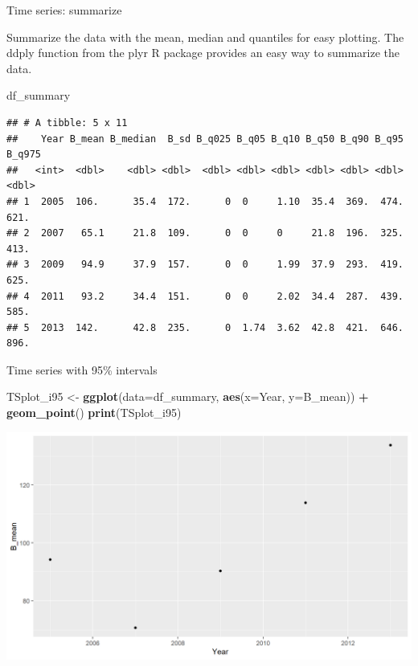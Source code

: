\documentclass[
  ignorenonframetext,
]{beamer}
\newenvironment{Shaded}{\begin{snugshade}}{\end{snugshade}}
\newcommand{\DataTypeTok}[1]{\textcolor[rgb]{0.13,0.29,0.53}{#1}}
\newcommand{\KeywordTok}[1]{\textcolor[rgb]{0.13,0.29,0.53}{\textbf{#1}}}
\newcommand{\NormalTok}[1]{#1}
\newcommand{\OperatorTok}[1]{\textcolor[rgb]{0.81,0.36,0.00}{\textbf{#1}}}
\newcommand{\StringTok}[1]{\textcolor[rgb]{0.31,0.60,0.02}{#1}}
\begin{document}
\begin{frame}[fragile]{Time series: summarize}
\protect\hypertarget{time-series-summarize-1}{}

Summarize the data with the mean, median and quantiles for easy
plotting. The ddply function from the plyr R package provides an easy
way to summarize the data.

\begin{Shaded}
\begin{Highlighting}[]
\NormalTok{df_summary}
\end{Highlighting}
\end{Shaded}

\begin{verbatim}
## # A tibble: 5 x 11
##    Year B_mean B_median  B_sd B_q025 B_q05 B_q10 B_q50 B_q90 B_q95 B_q975
##   <int>  <dbl>    <dbl> <dbl>  <dbl> <dbl> <dbl> <dbl> <dbl> <dbl>  <dbl>
## 1  2005  106.      35.4  172.      0  0     1.10  35.4  369.  474.   621.
## 2  2007   65.1     21.8  109.      0  0     0     21.8  196.  325.   413.
## 3  2009   94.9     37.9  157.      0  0     1.99  37.9  293.  419.   625.
## 4  2011   93.2     34.4  151.      0  0     2.02  34.4  287.  439.   585.
## 5  2013  142.      42.8  235.      0  1.74  3.62  42.8  421.  646.   896.
\end{verbatim}

\end{frame}

\begin{frame}[fragile]{Time series with 95\% intervals}
\protect\hypertarget{time-series-with-95-intervals}{}

\begin{Shaded}
\begin{Highlighting}[]
\NormalTok{TSplot_i95 <-}\StringTok{ }\KeywordTok{ggplot}\NormalTok{(}\DataTypeTok{data=}\NormalTok{df_summary, }\KeywordTok{aes}\NormalTok{(}\DataTypeTok{x=}\NormalTok{Year, }\DataTypeTok{y=}\NormalTok{B_mean)) }\OperatorTok{+}\StringTok{ }
\StringTok{  }\KeywordTok{geom_point}\NormalTok{()}
\KeywordTok{print}\NormalTok{(TSplot_i95)}
\end{Highlighting}
\end{Shaded}

\begin{center}\includegraphics[width=0.8\linewidth]{figure/sp_TSplot_i95a-1} \end{center}

\end{frame}
\end{document}
